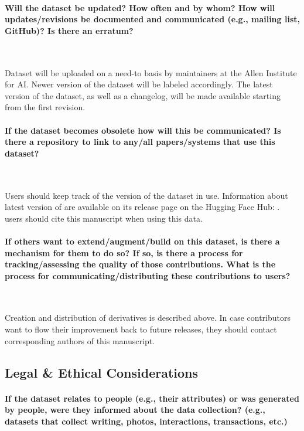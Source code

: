 \paragraph{Will the dataset be updated? How often and by whom? How will updates/revisions be documented and communicated (e.g., mailing list, GitHub)? Is there an erratum?}~

Dataset will be uploaded on a need-to basis by maintainers at the Allen Institute for AI.
Newer version of the dataset will be labeled accordingly. 
The latest version of the dataset, as well as a changelog, will be made available starting from the first revision.

\paragraph{If the dataset becomes obsolete how will this be communicated? Is there a repository to link to any/all papers/systems that use this dataset?}~

Users should keep track of the version of the dataset in use. 
Information about latest version of \dolma  are available on its release page on the Hugging Face Hub: \href{https://huggingface.co/datasets/allenai/dolma}{}.
\dolma users should cite this manuscript when using this data.




\paragraph{If others want to extend/augment/build on this dataset, is there a mechanism for them to do so? If so, is there a process for tracking/assessing the quality of those contributions. What is the process for communicating/distributing these contributions to users?}~

Creation and distribution of derivatives is described above. 
In case contributors want to flow their improvement back to future \dolma releases, they should contact corresponding authors of this manuscript.

\subsection{Legal \& Ethical Considerations}
\paragraph{If the dataset relates to people (e.g., their attributes) or was generated by people, were they informed about the data collection? (e.g., datasets that collect writing, photos, interactions, transactions, etc.)}~

